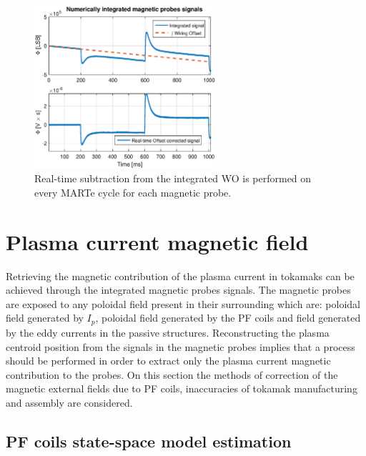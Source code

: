 \begin{figure}[htbp]
	\centering
	\includegraphics[width=0.6\textwidth]{Chp4/offset_remov_1}
	\caption{\label{offset_remove} Real-time subtraction from the integrated WO is performed on every MARTe cycle for each magnetic probe.  }
\end{figure}

%


\section{Plasma current magnetic field }

Retrieving the magnetic contribution of the plasma current in tokamaks can be achieved through the integrated magnetic probes signals. The magnetic probes are exposed to any poloidal field present in their surrounding which are: poloidal field generated by $I_p$, poloidal field generated by the PF coils and field generated by the eddy currents in the passive structures. Reconstructing the plasma centroid position from the signals in the magnetic probes implies that a process should be performed in order to extract only the plasma current magnetic contribution to the probes.  On this section the methods of correction of the magnetic external fields due to PF coils, inaccuracies of tokamak manufacturing and assembly are considered. \smallskip


\subsection{PF coils state-space model estimation}

